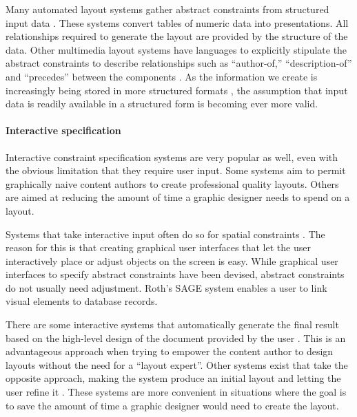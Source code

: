      Many automated layout systems gather abstract constraints from structured
     input data \citep{mackinlay-1,casner-1,borning-1,beach-1}. These systems
     convert tables of numeric data into presentations. All relationships
     required to generate the layout are provided by the structure of the data.
     Other multimedia layout systems have languages to explicitly stipulate the
     abstract constraints to describe relationships such as “author-of,”
     “description-of” and “precedes” between the components
     \citep{weitzman-2,graf-1}. As the information we create is increasingly
     being stored in more structured formats \citep{bray-1}, the assumption
     that input data is readily available in a structured form is becoming ever
     more valid.

     \paragraph{Interactive specification}

      Interactive constraint specification systems are very popular as well,
      even with the obvious limitation that they require user input. Some
      systems aim to permit graphically naive content authors to create
      professional quality layouts. Others are aimed at reducing the amount of
      time a graphic designer needs to spend on a layout.

      Systems that take interactive input often do so for spatial constraints
      \citep{singh-2,hudson-2,borning-1}. The reason for this is that creating
      graphical user interfaces that let the user interactively place or adjust
      objects on the screen is easy. While graphical user interfaces to specify
      abstract constraints have been devised, abstract constraints do not
      usually need adjustment. Roth’s SAGE system \citep{roth-1} enables a user
      to link visual elements to database records.

      There are some interactive systems that automatically generate the final
      result based on the high-level design of the document provided by the
      user \citep{kim-1}. This is an advantageous approach when trying to
      empower the content author to design layouts without the need for a
      ``layout expert''. Other systems exist that take the opposite approach,
      making the system produce an initial layout and letting the user refine
      it \citep{singh-1}. These systems are more convenient in situations where
      the goal is to save the amount of time a graphic designer would need to
      create the layout.


